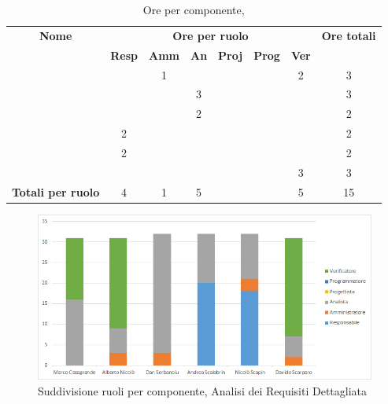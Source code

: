 \begin{table}[H]
	\begin{center}
		\begin{tabular}{|c|c|c|c|c|c|c|c|}
			\hline
			\textbf{Nome} & \multicolumn{6}{c|}{\textbf{Ore per ruolo}} & \textbf{Ore totali} \\\cline{2-7}
			& \textbf{Resp} & \textbf{Amm} & \textbf{An} & \textbf{Proj} & \textbf{Prog} & \textbf{Ver} & \\
			\hline
			\MC			&		&	1	&	 	&		&		&	2 	&	 3	\\
			\hline
			\AN			&		&		&	3 	&	 	&		&	 	& 	 3	\\
			\hline
			\DAN		&		&	 	&	2 	&		&		&		&	 2	\\
			\hline
			\AS			&	2	&	 	&	  	&		&	 	& 		&	 2	\\
			\hline
			\NS 		&	2	&		&	 	&		&		& 		&	 2	\\
			\hline
			\DS			& 		&	 	&	 	&		&		&	3 	&	 3	\\
			\hline
			\textbf{Totali per ruolo}	& 	4	&	1	&	5	&		&		&	5	&	15	\\
			\hline
		\end{tabular}
	\end{center}
	\caption{Ore per componente, \ARD}
\end{table}

\begin{figure}[H]
	\centering
	\includegraphics[scale=0.6]{img/6-1a.png}
	\caption{Suddivisione ruoli per componente, Analisi dei Requisiti Dettagliata}
\end{figure}

